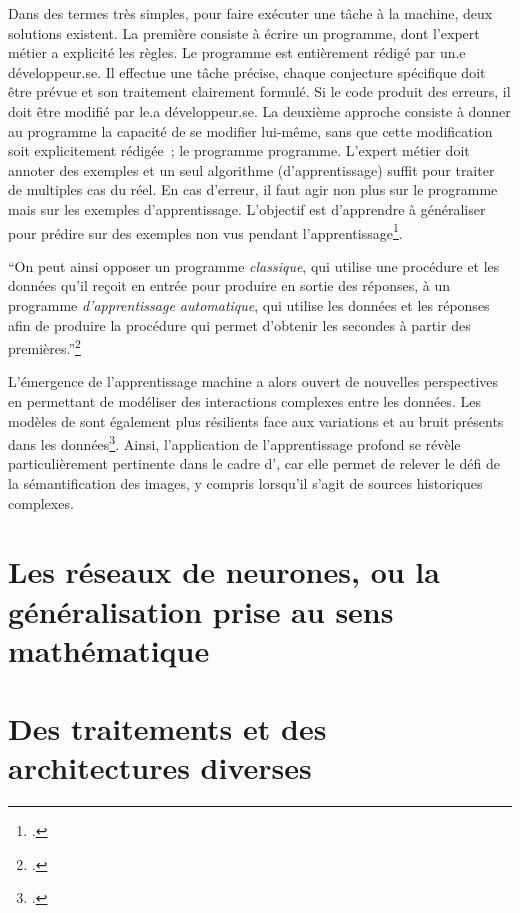 Dans des termes très simples, pour faire exécuter une tâche à la
machine, deux solutions existent. La première consiste à écrire un
programme, dont l'expert métier a explicité les règles. Le programme est
entièrement rédigé par un.e développeur.se. Il effectue une tâche précise,
chaque conjecture spécifique doit être prévue et son traitement
clairement formulé. Si le code produit des erreurs, il doit être modifié
par le.a développeur.se. La deuxième approche consiste à donner au programme
la capacité de se modifier lui-même, sans que cette modification soit
explicitement rédigée~; le programme programme. L'expert métier doit
annoter des exemples et un seul algorithme (d'apprentissage) suffit pour
traiter de multiples cas du réel. En cas d'erreur, il faut agir non plus
sur le programme mais sur les exemples d'apprentissage. L'objectif est
d'apprendre à généraliser pour prédire sur des exemples non vus pendant
l'apprentissage\footcite[p.7]{chollet_apprentissage_2020}.

\begin{kwote}         
``On peut ainsi opposer un programme \emph{classique}, qui utilise une
procédure et les données qu'il reçoit en entrée pour produire en sortie
des réponses, à un programme \emph{d'apprentissage automatique}, qui
utilise les données et les réponses afin de produire la procédure qui
permet d'obtenir les secondes à partir des premières.''\footcite[p.1-2]{azencott_introduction_2022}
\end{kwote} 

L'émergence de l'apprentissage machine a alors ouvert de nouvelles
perspectives en permettant de modéliser des interactions complexes entre
les données. Les modèles de \dl sont également plus
résilients face aux variations et au bruit présents dans les
données\footcite{juneja_deep_2023}. Ainsi,
l'application de l'apprentissage profond se révèle particulièrement
pertinente dans le cadre d'\eida, car elle permet de relever le défi
de la sémantification des images, y compris lorsqu'il s'agit de sources
historiques complexes.

        \hypertarget{les-reseaux-de-neurone}{%
        \section{Les réseaux de neurones, ou la généralisation prise au sens
        mathématique}\label{les-reseaux-de-neurone}}
         


        \hypertarget{des-traitements-et-des-architectures-diverses}{%
        \section{Des traitements et des architectures
        diverses}\label{des-traitements-et-des-architectures-diverses}}
         

